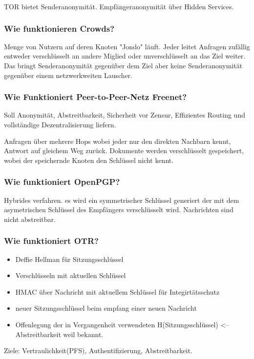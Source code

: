 	TOR bietet Senderanonymität. Empfängeranonymität über Hidden Services.
	
	\subsubsection{Wie funktionieren Crowds?}
	Menge von Nutzern auf deren Knoten "Jondo" läuft. Jeder leitet Anfragen zufällig  entweder verschlüsselt an andere Miglied oder unverschlüsselt an das Ziel weiter. Das bringt Senderanonymität gegenüber dem Ziel aber keine Senderanonymität gegenüber einem netzwerkweiten Lauscher.
	
	\subsubsection{Wie Funktioniert Peer-to-Peer-Netz Freenet?}
	Soll Anonymität, Abstreitbarkeit, Sicherheit vor Zensur, Effizientes Routing und vollständige Dezentralisierung liefern.
	
	Anfragen über mehrere Hops wobei jeder nur den direkten Nachbarn kennt, Antwort auf gleichem Weg zurück.
	Dokumente werden verschlüsselt gespeichert, wobei der speichernde Knoten den Schlüssel nicht kennt.
	
	\subsubsection{Wie funktioniert OpenPGP?}
	Hybrides verfahren. es wird ein symmetrischer Schlüssel generiert der mit dem asymetrischen Schlüssel des Empfängers verschlüsselt wird. Nachrichten sind nicht abstreitbar.
	
	\subsubsection{Wie funktioniert OTR?}
	\begin{itemize}
		\item Deffie Hellman für Sitzungsschlüssel
		\item Verschlüsseln mit aktuellen Schlüssel
		\item HMAC über Nachricht mit aktuellem Schlüssel für Integirtätsschutz
		\item neuer Sitzungsschlüssel beim empfang einer neuen Nachricht
		\item Offenlegung der in Vergangenheit verwendeten H(Sitzungsschlüssel) <-- Abstreitbarkeit weil bekannt.
	\end{itemize}
	Ziele: Vertraulichkeit(PFS), Authentifizierung, Abstreitbarkeit.
